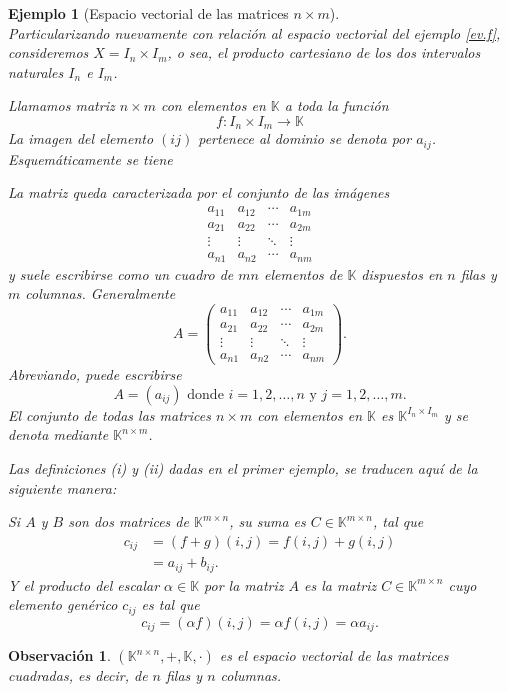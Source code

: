 \documentclass[b5paper, 11pt]{book}
\newcommand{\0}{\mathbf{0}}
\newcommand{\K}{\mathds{K}}
\newtheorem{obs}{Observación}[chapter]
\theoremstyle{estiloB}
\theoremstyle{estiloC}
\theoremstyle{estiloD}
\theoremstyle{estiloE}
\newtheorem{ejem}{Ejemplo}[chapter]
\begin{document}
\begin{ejem}[Espacio vectorial de las matrices $n \times m$]\textcolor{white}{.}\\
Particularizando nuevamente con relación al espacio vectorial del ejemplo \ref{ev.f}, consideremos $X= I_n \times I_m$, o sea, el producto cartesiano de los dos intervalos naturales $I_n$ e $I_m$.

Llamamos matriz $n \times m$ con elementos en $\K$ a toda la función
\[
f: I_n \times I_m \to \K
\]
La imagen del elemento $(ij)$ pertenece al dominio se denota por $a_{ij}$. Esquemáticamente se tiene

La matriz queda caracterizada por el conjunto de las imágenes
\[
\begin{array}{cccc}
a_{11} & a_{12} & \cdots & a_{1m} \\ 
a_{21} & a_{22} & \cdots & a_{2m} \\ 
\vdots & \vdots & \ddots & \vdots \\ 
a_{n1} & a_{n2} & \cdots & a_{nm}
\end{array} 
\]
y suele escribirse como un cuadro de $mn$ elementos de $\K$ dispuestos en $n$ filas y $m$ columnas. Generalmente
\[
A=
\begin{pmatrix}
a_{11} & a_{12} & \cdots & a_{1m} \\ 
a_{21} & a_{22} & \cdots & a_{2m} \\ 
\vdots & \vdots & \ddots & \vdots \\ 
a_{n1} & a_{n2} & \cdots & a_{nm}
\end{pmatrix}. 
\]
Abreviando, puede escribirse
\[
A= (a_{ij}) \text{ donde } i=1,2, \ldots, n \text{ y } j=1,2, \ldots ,m.
\]
El conjunto de todas las matrices $n \times m$ con elementos en $\K$ es $\K^{I_n \times I_m}$ y se denota mediante $\K^{n \times m}$.

Las definiciones \textit{(i)} y \textit{(ii)} dadas en el primer ejemplo, se traducen aquí de la siguiente manera:

Si $A$ y $B$ son dos matrices de $\K^{m \times n}$, su suma es $C \in \K^{m \times n}$, tal que
\begin{align*}
c_{ij}	&= (f+g)(i,j)= f(i,j)+ g(i,j)\\
		&=a_{ij}+ b_{ij}.
\end{align*}
Y el producto del escalar $\alpha \in \K$ por la matriz $A$ es la matriz $C \in \K^{m \times n}$ cuyo elemento genérico $c_{ij}$ es tal que
\[
c_{ij}= (\alpha f)(i,j)= \alpha f(i,j)= \alpha a_{ij}.
\]
\end{ejem}
\begin{obs}
$(\K^{n\times n}, +, \K, \cdot)$ es el espacio vectorial de las matrices cuadradas, es decir, de $n$ filas y $n$ columnas.
\end{obs}
\end{document}
